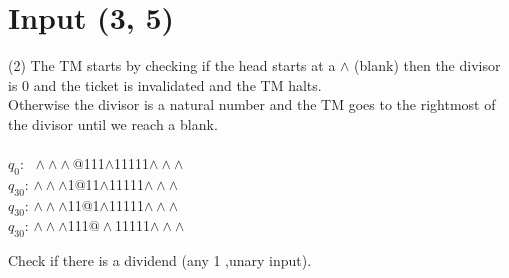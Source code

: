 \documentclass{article} %
\begin{document}
    \section{Input (3, 5)}
    \begin{center}
        \begin{varwidth}{\textwidth}
        \begin{tasks}[label={(\roman*)}] (2)
            \task
            The TM starts by checking if the head starts at a $\land$ (blank) then the divisor is 0 and the ticket is invalidated and the TM halts.\\ Otherwise the divisor is a natural number and the TM goes to the rightmost of the divisor until we reach a blank.\\\\
            $q_0$: $\;\land\land\land$@111$\land$11111$\land\land\land$\\
            $q_{30}$: $\land\land\land$1@11$\land$11111$\land\land\land$\\
            $q_{30}$: $\land\land\land$11@1$\land$11111$\land\land\land$\\
            $q_{30}$: $\land\land\land$111$@\land$11111$\land\land\land$ 

            \task
            Check if there is a dividend (any 1 ,unary input).
        \end{tasks}
        \end{varwidth}
    \end{center}
\end{document}
